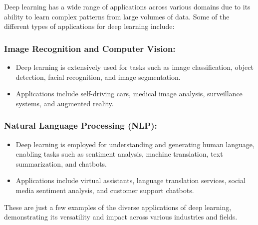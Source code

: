 Deep learning has a wide range of applications across various domains due to its ability to learn complex patterns from large volumes of data. Some of the different types of applications for deep learning include:

\subsubsection*{Image Recognition and Computer Vision:}

\begin{itemize}
    \item Deep learning is extensively used for tasks such as image classification, object detection, facial recognition, and image segmentation.
    \item Applications include self-driving cars, medical image analysis, surveillance systems, and augmented reality.
\end{itemize}

\subsubsection*{Natural Language Processing (NLP):}

\begin{itemize}
    \item Deep learning is employed for understanding and generating human language, enabling tasks such as sentiment analysis, machine translation, text summarization, and chatbots.
    \item Applications include virtual assistants, language translation services, social media sentiment analysis, and customer support chatbots.
\end{itemize}


These are just a few examples of the diverse applications of deep learning, demonstrating its versatility and impact across various industries and fields.